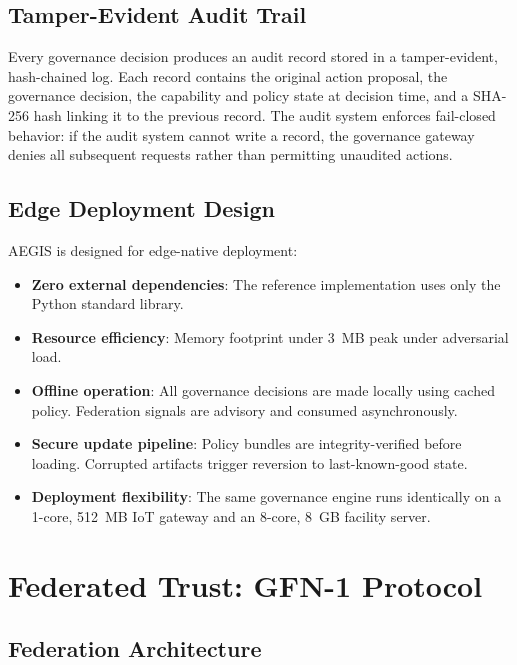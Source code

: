 \documentclass[journal]{IEEEtran}
\begin{document}
\subsection{Tamper-Evident Audit Trail}

Every governance decision produces an audit record stored in a tamper-evident, hash-chained log. Each record contains the original action proposal, the governance decision, the capability and policy state at decision time, and a SHA-256 hash linking it to the previous record. The audit system enforces fail-closed behavior: if the audit system cannot write a record, the governance gateway denies all subsequent requests rather than permitting unaudited actions.

\subsection{Edge Deployment Design}

AEGIS is designed for edge-native deployment:

\begin{itemize}
\item \textbf{Zero external dependencies}: The reference implementation uses only the Python standard library.
\item \textbf{Resource efficiency}: Memory footprint under 3~MB peak under adversarial load.
\item \textbf{Offline operation}: All governance decisions are made locally using cached policy. Federation signals are advisory and consumed asynchronously.
\item \textbf{Secure update pipeline}: Policy bundles are integrity-verified before loading. Corrupted artifacts trigger reversion to last-known-good state.
\item \textbf{Deployment flexibility}: The same governance engine runs identically on a 1-core, 512~MB IoT gateway and an 8-core, 8~GB facility server.
\end{itemize}

\section{Federated Trust: GFN-1 Protocol}

\subsection{Federation Architecture}
\end{document}

